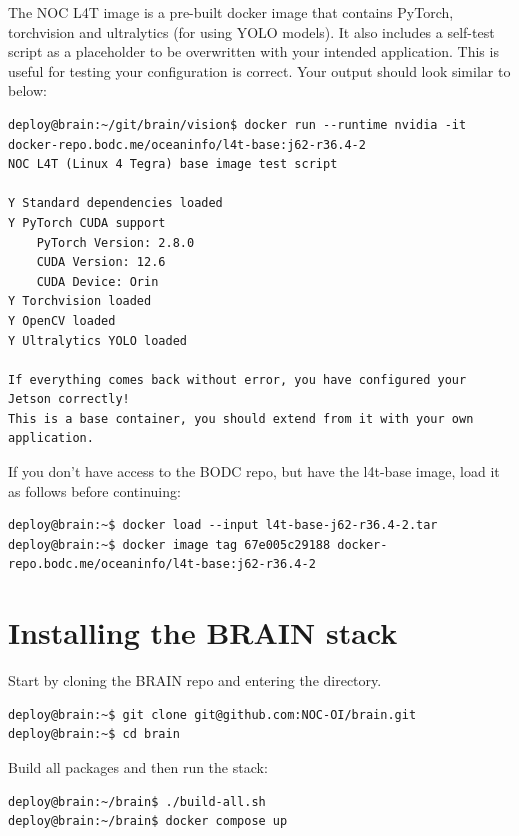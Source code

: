 \documentclass[11pt]{article}
\begin{document}
The NOC L4T image is a pre-built docker image that contains PyTorch, torchvision and ultralytics (for using YOLO models). It also includes a self-test script as a placeholder to be overwritten with your intended application. This is useful for testing your configuration is correct. Your output should look similar to below:


\lstset{style=console}
\begin{lstlisting}
deploy@brain:~/git/brain/vision$ docker run --runtime nvidia -it docker-repo.bodc.me/oceaninfo/l4t-base:j62-r36.4-2
NOC L4T (Linux 4 Tegra) base image test script

Y Standard dependencies loaded
Y PyTorch CUDA support
    PyTorch Version: 2.8.0
    CUDA Version: 12.6
    CUDA Device: Orin
Y Torchvision loaded
Y OpenCV loaded
Y Ultralytics YOLO loaded

If everything comes back without error, you have configured your Jetson correctly!
This is a base container, you should extend from it with your own application.
\end{lstlisting}

If you don't have access to the BODC repo, but have the l4t-base image, load it as follows before continuing:

\lstset{style=console}
\begin{lstlisting}
deploy@brain:~$ docker load --input l4t-base-j62-r36.4-2.tar
deploy@brain:~$ docker image tag 67e005c29188 docker-repo.bodc.me/oceaninfo/l4t-base:j62-r36.4-2
\end{lstlisting}

\newpage

\section{Installing the BRAIN stack}

Start by cloning the BRAIN repo and entering the directory.

\lstset{style=console}
\begin{lstlisting}
deploy@brain:~$ git clone git@github.com:NOC-OI/brain.git
deploy@brain:~$ cd brain
\end{lstlisting}

Build all packages and then run the stack:

\lstset{style=console}
\begin{lstlisting}
deploy@brain:~/brain$ ./build-all.sh
deploy@brain:~/brain$ docker compose up
\end{lstlisting}
\end{document}
